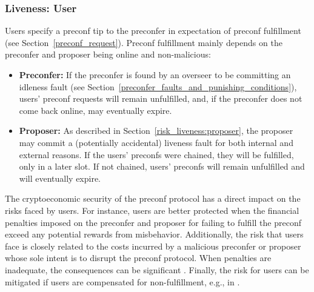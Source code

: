 \documentclass[a4paper]{article}
\theoremstyle{boldstyle}
\begin{document}
    \subsubsection{Liveness: User} 
    Users specify a preconf tip to the preconfer in expectation of preconf fulfillment (see Section~\ref{preconf_request}).
    Preconf fulfillment mainly depends on the preconfer and proposer being online and non-malicious:
        \begin{itemize}
            \item \textbf{Preconfer:} If the preconfer is found by an overseer to be committing an idleness fault (see Section~\ref{preconfer_faults_and_punishing_conditions}), users' preconf requests will remain unfulfilled, and, if the preconfer does not come back online, may eventually expire. 
            \item \textbf{Proposer:} As described in Section~\ref{risk_liveness:proposer}, the proposer may commit a (potentially accidental) liveness fault for both internal and external reasons. If the users' preconfs were chained, they will be fulfilled, only in a later slot. If not chained, users' preconfs will remain unfulfilled and will eventually expire.
        \end{itemize}
    The cryptoeconomic security of the preconf protocol has a direct impact on the risks faced by users. For instance, users are better protected when the financial penalties imposed on the preconfer and proposer for failing to fulfill the preconf exceed any potential rewards from misbehavior. Additionally, the risk that users face is closely related to the costs incurred by a malicious preconfer or proposer whose sole intent is to disrupt the preconf protocol. When penalties are inadequate, the consequences can be significant \cite{W:MEVLawsuit, W:TotalEclipseOfTheRelay}. Finally, the risk for users can be mitigated if users are compensated for non-fulfillment, e.g., in \cite{W:Documentation-Understandingmev-commit}. 
    
\end{document}
